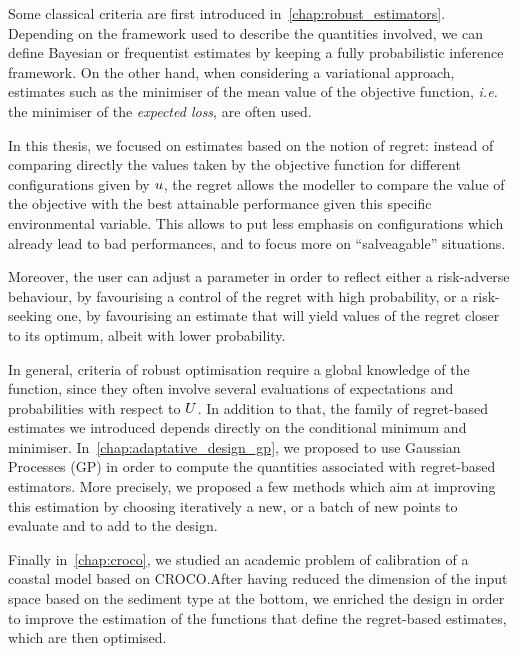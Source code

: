 \documentclass[../../Main_ManuscritThese.tex]{subfiles}
\begin{document}
Some classical criteria are first introduced
in~\cref{chap:robust_estimators}. Depending on the framework used to
describe the quantities involved, we can define Bayesian or
frequentist estimates by keeping a fully probabilistic inference
framework. On the other hand, when considering a variational approach,
estimates such as the minimiser of the mean value of the objective
function, \emph{i.e.} the minimiser of the \emph{expected loss}, are
often used.

In this thesis, we focused on estimates based on the notion of regret:
instead of comparing directly the values taken by the objective
function for different configurations given by $u$, the regret
allows the modeller to compare the value of the objective with the
best attainable performance given this specific environmental
variable.  This allows to put less emphasis on configurations which
already lead to bad performances, and to focus more on ``salveagable''
situations.

Moreover, the user can adjust a parameter in order to reflect either a
risk-adverse behaviour, by favourising a control of the regret with
high probability, or a risk-seeking one, by favourising an estimate
that will yield values of the regret closer to its optimum, albeit
with lower probability.


In general, criteria of robust optimisation require a global knowledge
of the function, since they often involve several evaluations of
expectations and probabilities with respect to $U$. In addition to
that, the family of regret-based estimates we introduced depends
directly on the conditional minimum and
minimiser. In~\cref{chap:adaptative_design_gp}, we proposed to use
Gaussian Processes (GP) in order to compute the quantities associated
with regret-based estimators. More precisely, we proposed a few
methods which aim at improving this estimation by choosing iteratively
a new, or a batch of new points to evaluate and to add to the design.

Finally in~\cref{chap:croco}, we studied an academic problem of
calibration of a coastal model based on CROCO.\@ After having reduced
the dimension of the input space based on the sediment type at the
bottom, we enriched the design in order to improve the estimation of
the functions that define the regret-based estimates, which are then
optimised.
\end{document}
